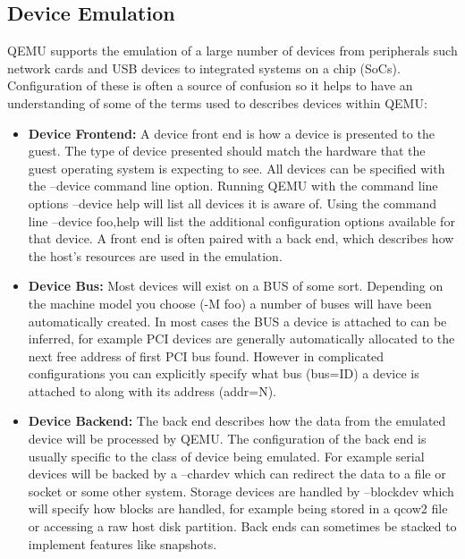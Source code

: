 \subsection{Device Emulation}
QEMU supports the emulation of a large number of devices from peripherals such network cards and USB devices to integrated systems on a chip (SoCs). Configuration of these is often a source of confusion so it helps to have an understanding of some of the terms used to describes devices within QEMU: 
\begin{itemize}
    \item \textbf{Device Frontend:} A device front end is how a device is presented to the guest. The type of device presented should match the hardware that the guest operating system is expecting to see. All devices can be specified with the --device command line option. Running QEMU with the command line options --device help will list all devices it is aware of. Using the command line --device foo,help will list the additional configuration options available for that device.
    A front end is often paired with a back end, which describes how the host’s resources are used in the emulation. 
    \item \textbf{Device Bus:} Most devices will exist on a BUS of some sort. Depending on the machine model you choose (-M foo) a number of buses will have been automatically created. In most cases the BUS a device is attached to can be inferred, for example PCI devices are generally automatically allocated to the next free address of first PCI bus found. However in complicated configurations you can explicitly specify what bus (bus=ID) a device is attached to along with its address (addr=N).
    \item \textbf{Device Backend:} The back end describes how the data from the emulated device will be processed by QEMU. The configuration of the back end is usually specific to the class of device being emulated. For example serial devices will be backed by a --chardev which can redirect the data to a file or socket or some other system. Storage devices are handled by --blockdev which will specify how blocks are handled, for example being stored in a qcow2 file or accessing a raw host disk partition. Back ends can sometimes be stacked to implement features like snapshots. 
\end{itemize}


